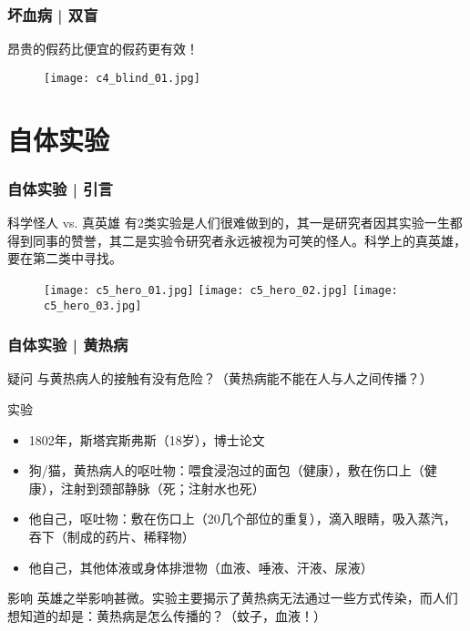 \begin{frame}
  \frametitle{坏血病 | 双盲}
  \begin{center}
    \alert{昂贵的假药比便宜的假药更有效！}
  \end{center}
  \begin{figure}
    \centering
    \texttt{[image: c4\_blind\_01.jpg]}
  \end{figure}
\end{frame}

\section{自体实验}
\begin{frame}
  \frametitle{自体实验 | 引言}
  \begin{block}{科学怪人 vs. 真英雄}
    有2类实验是人们很难做到的，其一是研究者因其实验一生都得到同事的赞誉，其二是实验令研究者永远被视为可笑的怪人。科学上的真英雄，要在第二类中寻找。
  \end{block}
  \begin{figure}
    \centering
    \texttt{[image: c5\_hero\_01.jpg]}
    \texttt{[image: c5\_hero\_02.jpg]}
    \texttt{[image: c5\_hero\_03.jpg]}
  \end{figure}
\end{frame}

\begin{frame}
  \frametitle{自体实验 | 黄热病}
  \begin{block}{疑问}
    与黄热病人的接触有没有危险？（黄热病能不能在人与人之间传播？）
  \end{block}
  \pause
  \begin{block}{实验}
    \begin{itemize}
      \item 1802年，斯塔宾斯\textbullet 弗斯（18岁），博士论文
      \item 狗/猫，黄热病人的呕吐物：喂食浸泡过的面包（健康），敷在伤口上（健康），注射到颈部静脉（死；注射水也死）
      \item 他自己，呕吐物：敷在伤口上（20几个部位的重复），滴入眼睛，吸入蒸汽，吞下（制成的药片、稀释物）
      \item 他自己，其他体液或身体排泄物（血液、唾液、汗液、尿液）
    \end{itemize}
  \end{block}
  \pause
  \begin{block}{影响}
英雄之举影响甚微。实验主要揭示了黄热病无法通过一些方式传染，而人们想知道的却是：黄热病是怎么传播的？（蚊子，血液！）
  \end{block}
\end{frame}


